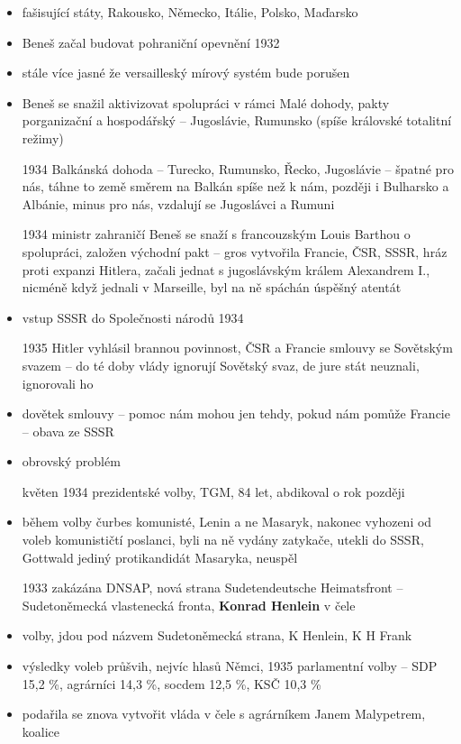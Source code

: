 \documentclass{article}
\begin{document}
\begin{itemize}
    \item fašisující státy, Rakousko, Německo, Itálie, Polsko, Maďarsko
    \item Beneš začal budovat pohraniční opevnění 1932
    \item stále více jasné že versailleský mírový systém bude porušen
    \item Beneš se snažil aktivizovat spolupráci v rámci Malé dohody, pakty porganizační a hospodářský -- Jugoslávie, Rumunsko (spíše královské totalitní režimy)
    \item[1934] Balkánská dohoda --  Turecko, Rumunsko, Řecko, Jugoslávie -- špatné pro nás, táhne to země směrem na Balkán spíše než k nám, později i Bulharsko a Albánie, minus pro nás, vzdalují se Jugoslávci a Rumuni
    \item[1934] ministr zahraničí Beneš se snaží s francouzským Louis Barthou o spolupráci, založen východní pakt -- gros vytvořila Francie, ČSR, SSSR, hráz proti expanzi Hitlera, začali jednat s jugoslávským králem Alexandrem I., nicméně když jednali v Marseille, byl na ně spáchán úspěšný atentát
    \item vstup SSSR do Společnosti národů 1934
    \item[1935] Hitler vyhlásil brannou povinnost, ČSR a Francie smlouvy se Sovětským svazem -- do té doby vlády ignorují Sovětský svaz, de jure stát neuznali, ignorovali ho
    \item dovětek smlouvy -- pomoc nám mohou jen tehdy, pokud nám pomůže Francie -- obava ze SSSR
    \item obrovský problém
    \item[květen 1934] prezidentské volby, TGM, 84 let, abdikoval o rok později
    \item během volby čurbes komunisté, Lenin a ne Masaryk, nakonec vyhozeni od voleb komunističtí poslanci, byli na ně vydány zatykače, utekli do SSSR, Gottwald jediný protikandidát Masaryka, neuspěl
    \item[1933] zakázána DNSAP, nová strana Sudetendeutsche Heimatsfront -- Sudetoněmecká vlastenecká fronta, \textbf{Konrad Henlein}  v čele
    \item volby, jdou pod názvem Sudetoněmecká strana, K Henlein, K H Frank
    \item výsledky voleb průšvih, nejvíc hlasů Němci, 1935 parlamentní volby -- SDP 15,2 \%, agrárníci 14,3 \%, socdem 12,5 \%, KSČ 10,3 \%
    \item podařila se znova vytvořit vláda v čele s agrárníkem Janem Malypetrem, koalice

\end{itemize}
\end{document}

